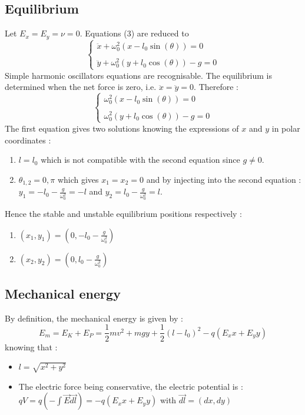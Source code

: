 \subsection{Equilibrium}
	Let $E_x=E_y=\nu=0$. Equations (3) are reduced to 
	\begin{equation}
	\left\{
	\begin{array}{l}
	\ddot{x} + \omega_0^2(x-l_0\sin(\theta))=0\\ \\
	\ddot{y} + \omega_0^2(y+l_0\cos(\theta))-g=0
	\end{array}
	\right.
	\end{equation}
	Simple harmonic oscillators equations are recognisable. The equilibrium is determined when the net force is zero, i.e. $\ddot{x}=\ddot{y}=0$. Therefore :
	\begin{equation}
	\left\{
	\begin{array}{l}
	\omega_0^2(x-l_0\sin(\theta))=0\\ \\
	\omega_0^2(y+l_0\cos(\theta))-g=0
	\end{array}
	\right.
	\end{equation}
	The first equation gives two solutions knowing the expressions of $x$ and $y$ in polar coordinates : 
	\begin{enumerate}
	\item $l=l_0$ which is not compatible with the second equation since $g\neq0$.
	\item $\theta_{1,2}=0,\pi$ which gives $x_1=x_2=0$ and by injecting into the second equation : $y_1= -l_0-\frac{g}{\omega_0^2}=-l$ and $y_2=l_0-\frac{g}{\omega_0^2}=l.$
	\end{enumerate}
	Hence the stable and unstable equilibrium positions respectively :
	\begin{enumerate}
	\item $(x_1,y_1)=(0,-l_0-\frac{g}{\omega_0^2})$
	\item $(x_2,y_2)=(0,l_0-\frac{g}{\omega_0^2})$
	\end{enumerate}

\subsection{Mechanical energy}
	By definition, the mechanical energy is given by :
	\begin{equation}
	E_m=E_K+E_P=\dfrac{1}{2}mv^2 + mgy+  \dfrac{1}{2}(l-l_0)^2 -q(E_xx+E_yy)
	\end{equation}
	knowing that : 
	\begin{itemize}
	\item $l=\sqrt{x^2+y^2}$
	\item The electric force being conservative, the electric potential is : 
	$qV=q\left(-\int\vec{E}\vec{dl}\right)=-q(E_xx+E_yy)$ with $\vec{dl}			=(dx,dy)$
	\end{itemize}

